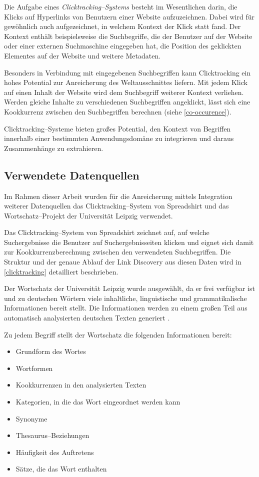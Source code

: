 Die Aufgabe eines \emph{Clicktracking--Systems} besteht im Wesentlichen darin, die Klicks auf Hyperlinks von Benutzern einer Website aufzuzeichnen. Dabei wird für gewöhnlich auch aufgezeichnet, in welchem Kontext der Klick statt fand. Der Kontext enthält beispielsweise die Suchbegriffe, die der Benutzer auf der Website oder einer externen Suchmaschine eingegeben hat, die Position des geklickten Elementes auf der Website und weitere Metadaten.

Besonders in Verbindung mit eingegebenen Suchbegriffen kann Clicktracking ein hohes Potential zur Anreicherung des Weltausschnittes liefern. Mit jedem Klick auf einen Inhalt der Website wird dem Suchbegriff weiterer Kontext verliehen. Werden gleiche Inhalte zu verschiedenen Suchbegriffen angeklickt, lässt sich eine Kookkurrenz zwischen den Suchbegriffen berechnen (siehe \ref{co-occurence}).

Clicktracking--Systeme bieten großes Potential, den Kontext von Begriffen innerhalb einer bestimmten Anwendungsdomäne zu integrieren und daraus Zusammenhänge zu extrahieren.

\subsection{Verwendete Datenquellen}
\label{used_sources}

Im Rahmen dieser Arbeit wurden für die Anreicherung mittels Integration weiterer Datenquellen das Clicktracking--System von Spreadshirt und das Wortschatz--Projekt der Universität Leipzig verwendet.

Das Clicktracking--System von Spreadshirt zeichnet auf, auf welche Suchergebnisse die  Benutzer auf Suchergebnisseiten klicken und eignet sich damit zur Kookkurrenzberechnung zwischen den verwendeten Suchbegriffen. Die Struktur und der genaue Ablauf der Link Discovery aus diesen Daten wird in \cref{clicktracking} detailliert beschrieben.

Der Wortschatz der Universität Leipzig \cite{ws2013} wurde ausgewählt, da er frei verfügbar ist und zu deutschen Wörtern viele inhaltliche, linguistische und grammatikalische Informationen bereit stellt. Die Informationen werden zu einem großen Teil aus automatisch analysierten deutschen Texten generiert \cite{gh2011}.

Zu jedem Begriff stellt der Wortschatz die folgenden Informationen bereit:

\begin{itemize}
    \item Grundform des Wortes
    \item Wortformen
    \item Kookkurrenzen in den analysierten Texten
    \item Kategorien, in die das Wort eingeordnet werden kann
    \item Synonyme
    \item Thesaurus--Beziehungen
    \item Häufigkeit des Auftretens
    \item Sätze, die das Wort enthalten
\end{itemize}

